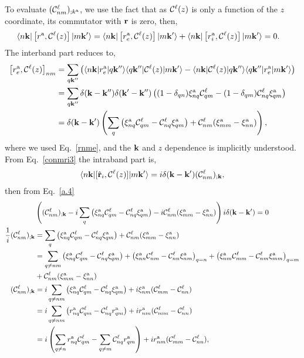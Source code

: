 To evaluate $({\mathbf{\cal C}}^\ell_{nm})_{;k^{\mathrm{a}}}$, we use the fact that as
${\mathbf{\cal C}}^\ell(z)$ is only a function of the $z$ coordinate, its commutator
with $\mathbf{r}$ is zero, then,
\begin{align}\label{a.4}
\langle n\mathbf{k} |
\left[r^{\mathrm{a}},{\mathbf{\cal C}}^\ell(z)\right]
| m\mathbf{k}' \rangle
&=
\langle n\mathbf{k} |
\left[r_e^{\mathrm{a}},{\mathbf{\cal C}}^\ell(z)\right]
| m\mathbf{k}' \rangle
+
\langle n\mathbf{k} |
\left[r_i^{\mathrm{a}},{\mathbf{\cal C}}^\ell(z)\right]
| m\mathbf{k}' \rangle
=
 0
.
\end{align} 
The interband part reduces to,
\begin{align}\label{a.5}
\left[r_e^{\mathrm{a}},{\mathbf{\cal C}}^\ell(z)\right]_{nm}
&=
\sum_{q\mathbf{k}''}
\left(
\langle n\mathbf{k} |
r_e^{\mathrm{a}}
| q\mathbf{k}'' \rangle
\langle q\mathbf{k}'' |
{\mathbf{\cal C}}^\ell(z)
| m\mathbf{k}' \rangle
-
\langle n\mathbf{k} |
{\mathbf{\cal C}}^\ell(z)
 | q\mathbf{k}'' \rangle
\langle q\mathbf{k}'' |
r_e^{\mathrm{a}}
| m\mathbf{k}' \rangle
\right)
\nonumber\\
&=
\sum_{q\mathbf{k}''}
\delta(\mathbf{k}-\mathbf{k}'')
\delta(\mathbf{k}'-\mathbf{k}'')
\left(
(1-\delta_{qn})
\xi_{nq}^{\mathrm{a}}
{\mathbf{\cal C}}^\ell_{qm}
-
(1-\delta_{qm})
{\mathbf{\cal C}}^\ell_{nq}
\xi_{qm}^{\mathrm{a}}
\right)
\nonumber\\
&=
\delta(\mathbf{k}-\mathbf{k}')
\left(
\sum_{q}
\left(
\xi_{nq}^{\mathrm{a}}
{\mathbf{\cal C}}^\ell_{qm}
-
{\mathbf{\cal C}}^\ell_{nq}
\xi_{qm}^{\mathrm{a}}
\right)
+
{\mathbf{\cal C}}^\ell_{nm}(\xi_{mm}^{\mathrm{a}}-\xi_{nn}^{\mathrm{a}})
\right)
,
\end{align}
where we used Eq.~\eqref{rnme}, and the $\mathbf{k}$ and $z$ dependence is implicitly
understood. From Eq.~\eqref{conmri3} the intraband part is,
\begin{align}\label{a.6}
\langle n\mathbf{k} |[\hat{\mathbf{r}}_i,{\mathbf{\cal C}}^\ell(z)]| m\mathbf{k}' \rangle
=i\delta(\mathbf{k}-\mathbf{k}')({\mathbf{\cal C}}^\ell_{nm})_{;\mathbf{k}}
,
\end{align}
then from Eq.~\eqref{a.4}
\begin{align}\label{a.7}
&
\left(
({\mathbf{\cal C}}^\ell_{nm})_{;\mathbf{k}}
-i
\sum_{q}
\left(
\xi_{nq}^{\mathrm{a}}
{\mathbf{\cal C}}^\ell_{qm}
-
{\mathbf{\cal C}}^\ell_{nq}
\xi_{qm}^{\mathrm{a}}
\right)
-i
{\mathbf{\cal C}}^\ell_{nm}(\xi_{mm}^{\mathrm{a}}-\xi_{nn}^{\mathrm{a}})
\right) i\delta(\mathbf{k}-\mathbf{k}')
=0
\nonumber\\
\frac{1}{i}({\mathbf{\cal C}}^\ell_{nm})_{;\mathbf{k}}
&=
\sum_{q}
\left(
\xi_{nq}^{\mathrm{a}}
{\mathbf{\cal C}}^\ell_{qm}
-
{\mathbf{\cal C}}^\ell_{nq}
\xi_{qm}^{\mathrm{a}}
\right)
+
{\mathbf{\cal C}}^\ell_{nm}(\xi_{mm}^{\mathrm{a}}-\xi_{nn}^{\mathrm{a}})
\nonumber\\
&=
\sum_{q\ne nm}
\left(
\xi_{nq}^{\mathrm{a}}
{\mathbf{\cal C}}^\ell_{qm}
-
{\mathbf{\cal C}}^\ell_{nq}
\xi_{qm}^{\mathrm{a}}
\right)
+
\left(
\xi_{nn}^{\mathrm{a}}
{\mathbf{\cal C}}^\ell_{nm}
-
{\mathbf{\cal C}}^\ell_{nn}
\xi_{nm}^{\mathrm{a}}
\right)_{q=n}
+
\left(
\xi_{nm}^{\mathrm{a}}
{\mathbf{\cal C}}^\ell_{mm}
-
{\mathbf{\cal C}}^\ell_{nm}
\xi_{mm}^{\mathrm{a}}
\right)_{q=m}
\nonumber\\
&+
{\mathbf{\cal C}}^\ell_{nm}(\xi_{mm}^{\mathrm{a}}-\xi_{nn}^{\mathrm{a}})
\nonumber\\
({\mathbf{\cal C}}^\ell_{nm})_{;\mathbf{k}}
&=
i\sum_{q\ne nm}
\left(
\xi_{nq}^{\mathrm{a}}
{\mathbf{\cal C}}^\ell_{qm}
-
{\mathbf{\cal C}}^\ell_{nq}
\xi_{qm}^{\mathrm{a}}
\right)
+i\xi_{nm}^{\mathrm{a}}({\mathbf{\cal C}}^\ell_{mm}-{\mathbf{\cal C}}^\ell_{nn})
\nonumber\\
&=
i\sum_{q\ne nm}
\left(
r_{nq}^{\mathrm{a}} 
{\mathbf{\cal C}}^\ell_{qm}
-
{\mathbf{\cal C}}^\ell_{nq}
r_{qm}^{\mathrm{a}} 
\right) 
+ir_{nm}^{\mathrm{a}}({\mathbf{\cal C}}^\ell_{mm}-{\mathbf{\cal C}}^\ell_{nn}) 
\nonumber\\
&=
i \left(
\sum_{q\ne n} 
r_{nq}^{\mathrm{a}} 
{\mathbf{\cal C}}^\ell_{qm}
-
\sum_{q\ne m}
{\mathbf{\cal C}}^\ell_{nq}
r_{qm}^{\mathrm{a}} 
\right) 
+ir_{nm}^{\mathrm{a}}({\mathbf{\cal C}}^\ell_{mm}-{\mathbf{\cal C}}^\ell_{nn}) 
,
\end{align} 
